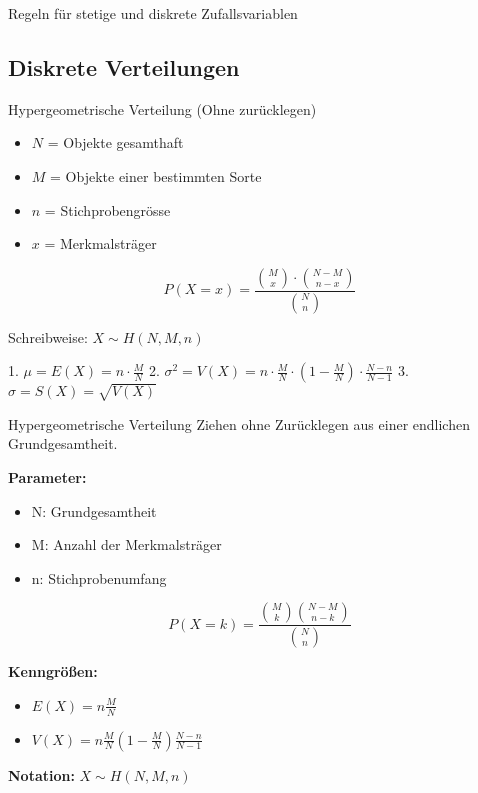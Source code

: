 

\begin{theorem}{Regeln für stetige und diskrete Zufallsvariablen}
   
\end{theorem}

\subsection{Diskrete Verteilungen}

\begin{definition}{Hypergeometrische Verteilung (Ohne zurücklegen)}
\begin{itemize}
  \item $N$ = Objekte gesamthaft
  \item $M$ = Objekte einer bestimmten Sorte
  \item $n$ = Stichprobengrösse
  \item $x$ = Merkmalsträger
\end{itemize}

$$P(X=x)=\frac{\binom{M}{x} \cdot \binom{N-M}{n-x}}{\binom{N}{n}}$$

Schreibweise: $X \sim H(N,M,n)$

1. $\mu = E(X) = n \cdot \frac{M}{N}$
2. $\sigma^2 = V(X) = n \cdot \frac{M}{N} \cdot (1-\frac{M}{N}) \cdot \frac{N-n}{N-1}$
3. $\sigma = S(X) = \sqrt{V(X)}$
\end{definition}

\begin{definition}{Hypergeometrische Verteilung}
Ziehen ohne Zurücklegen aus einer endlichen Grundgesamtheit.

\textbf{Parameter:}
\begin{itemize}
    \item N: Grundgesamtheit
    \item M: Anzahl der Merkmalsträger
    \item n: Stichprobenumfang
\end{itemize}

$$P(X=k) = \frac{\binom{M}{k}\binom{N-M}{n-k}}{\binom{N}{n}}$$

\textbf{Kenngrößen:}
\begin{itemize}
    \item $E(X) = n\frac{M}{N}$
    \item $V(X) = n\frac{M}{N}(1-\frac{M}{N})\frac{N-n}{N-1}$
\end{itemize}

\textbf{Notation:} $X \sim H(N,M,n)$
\end{definition}

